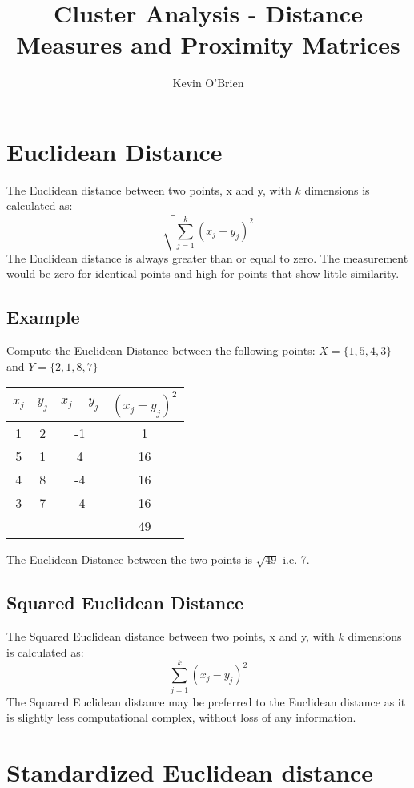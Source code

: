 \documentclass[12pt]{article}
\begin{document}
\author{Kevin O'Brien}
\title{Cluster Analysis - Distance Measures and Proximity Matrices}
\tableofcontents

\newpage
\section{Euclidean Distance}
The Euclidean distance between two points, x and y, with $k$ dimensions is calculated as:
\[ \sqrt{ \sum^{k}_{j=1} ( x_j - y_j)^2 } \]
The Euclidean distance is always greater than or equal to zero. The measurement would be zero for identical points and high for points that show little similarity.

\subsection{Example}
Compute the Euclidean Distance between the following points:
$X = \{1,5,4,3\}$ and $Y = \{2,1,8,7\}$

\begin{center}
\begin{tabular}{|c|c|c|c|}
  \hline
$x_j$	&	$y_j$	&   $x_j - y_j$	&	$(x_j - y_j)^2$	\\ \hline
1	&	2	&	-1	&	1	\\
5	&	1	&	4	&	16	\\
4	&	8	&	-4	&	16	\\
3	&	7	&	-4	&	16	\\ \hline
	&		&		&	49	\\ \hline
\end{tabular}
\end{center}
The Euclidean Distance between the two points is $\sqrt{49}$ i.e. 7.

\subsection{Squared Euclidean Distance}
The Squared Euclidean distance between two points, x and y, with $k$ dimensions is calculated as:
\[ \sum^{k}_{j=1} ( x_j - y_j)^2  \]
The Squared Euclidean distance may be preferred to the Euclidean distance as it is slightly less computational complex, without loss of any information.


\section{Standardized Euclidean distance}
\end{document}

